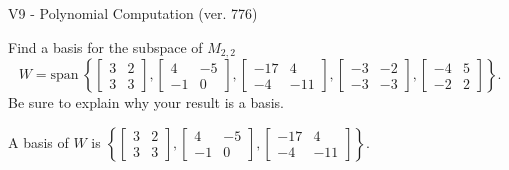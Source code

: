 \begin{exercise}
  \begin{exerciseTitle}V9 - Polynomial Computation (ver. 776)\end{exerciseTitle}
  \begin{exerciseStatement}
    Find a basis for the subspace of \(M_{2,2}\) 
\[W=\mathrm{span}\ \left\{\left[\begin{array}{cc}
3 & 2 \\
3 & 3
\end{array}\right] , \left[\begin{array}{cc}
4 & -5 \\
-1 & 0
\end{array}\right] , \left[\begin{array}{cc}
-17 & 4 \\
-4 & -11
\end{array}\right] , \left[\begin{array}{cc}
-3 & -2 \\
-3 & -3
\end{array}\right] , \left[\begin{array}{cc}
-4 & 5 \\
-2 & 2
\end{array}\right]\right\}.\]
 Be sure to explain why your result is a basis.


  \end{exerciseStatement}
  \begin{exerciseAnswer}
   A basis of \(W\) is  \(\left\{\left[\begin{array}{cc}
3 & 2 \\
3 & 3
\end{array}\right] , \left[\begin{array}{cc}
4 & -5 \\
-1 & 0
\end{array}\right] , \left[\begin{array}{cc}
-17 & 4 \\
-4 & -11
\end{array}\right]\right\}\).
  


  \end{exerciseAnswer}
\end{exercise}
